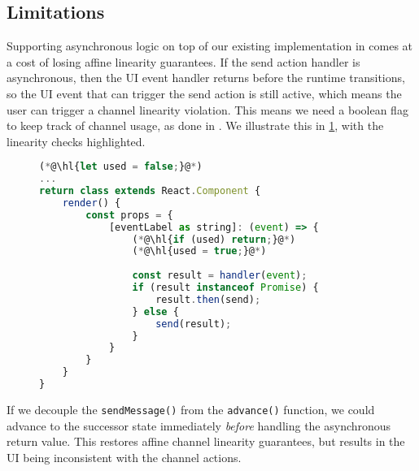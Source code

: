 \subsection{Limitations}
\label{subsection:asynclimit}

Supporting asynchronous logic on top of our
existing implementation in  comes at a cost
of losing affine linearity guarantees.
If the send action handler is asynchronous, then the UI event handler
returns before the runtime transitions, so the UI event that can trigger
the send action is still active, which means the user can trigger
a channel linearity violation. This means we need a boolean flag
to keep track of channel usage, as done in \cite{Hybrid2016}.
We illustrate this in \cref{lst:asynclinearcheck},
with the linearity checks highlighted.

\begin{figure}[!h]
\begin{lstlisting}[language=javascript]
(*@\hl{let used = false;}@*)
...
return class extends React.Component {
	render() {
		const props = {
			[eventLabel as string]: (event) => {
				(*@\hl{if (used) return;}@*)
				(*@\hl{used = true;}@*)
				
				const result = handler(event);
				if (result instanceof Promise) {
					result.then(send);
				} else {
					send(result);
				}
			}		
		}
	}
}
\end{lstlisting}
\label{lst:asynclinearcheck}
\end{figure}

If we decouple the \texttt{sendMessage()} 
from the \texttt{advance()} function, we could advance to the successor state
immediately \textit{before} handling the asynchronous return value.
This restores affine channel linearity guarantees, but 
results in the UI being inconsistent with the channel
actions.